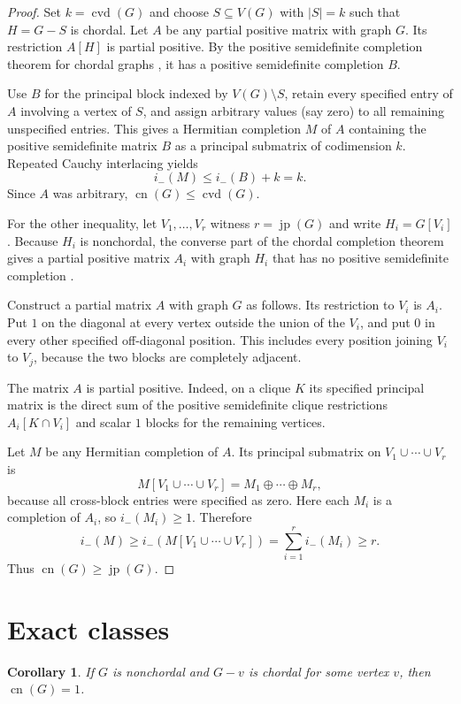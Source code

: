 \documentclass[11pt]{amsart}
\newtheorem{corollary}[theorem]{Corollary}
\newcommand{\cn}{\operatorname{cn}}
\newcommand{\cvd}{\operatorname{cvd}}
\newcommand{\jp}{\operatorname{jp}}
\begin{document}
\begin{proof}
Set $k=\cvd(G)$ and choose $S\subseteq V(G)$ with $|S|=k$ such that
$H=G-S$ is chordal.  Let $A$ be any partial positive matrix with graph $G$.
Its restriction $A[H]$ is partial positive.  By the positive semidefinite
completion theorem for chordal graphs \cite{GJSW}, it has a positive
semidefinite completion $B$.

Use $B$ for the principal block indexed by $V(G)\setminus S$, retain every
specified entry of $A$ involving a vertex of $S$, and assign arbitrary values
(say zero) to all remaining unspecified entries.  This gives a Hermitian
completion $M$ of $A$ containing the positive semidefinite matrix $B$ as a
principal submatrix of codimension $k$.  Repeated Cauchy interlacing yields
\[
 i_-(M)\leq i_-(B)+k=k.
\]
Since $A$ was arbitrary, $\cn(G)\leq\cvd(G)$.

For the other inequality, let $V_1,\ldots,V_r$ witness $r=\jp(G)$ and write
$H_i=G[V_i]$.  Because $H_i$ is nonchordal, the converse part of the chordal
completion theorem gives a partial positive matrix $A_i$ with graph $H_i$
that has no positive semidefinite completion \cite{GJSW,BC}.

Construct a partial matrix $A$ with graph $G$ as follows.  Its restriction to
$V_i$ is $A_i$.  Put $1$ on the diagonal at every vertex outside the union of
the $V_i$, and put $0$ in every other specified off-diagonal position.  This
includes every position joining $V_i$ to $V_j$, because the two blocks are
completely adjacent.

The matrix $A$ is partial positive.  Indeed, on a clique $K$ its specified
principal matrix is the direct sum of the positive semidefinite clique
restrictions $A_i[K\cap V_i]$ and scalar $1$ blocks for the remaining
vertices.

Let $M$ be any Hermitian completion of $A$.  Its principal submatrix on
$V_1\cup\cdots\cup V_r$ is
\[
 M[V_1\cup\cdots\cup V_r]
   =M_1\oplus\cdots\oplus M_r,
\]
because all cross-block entries were specified as zero.  Here each $M_i$ is a
completion of $A_i$, so $i_-(M_i)\geq1$.  Therefore
\[
 i_-(M)\geq i_-(M[V_1\cup\cdots\cup V_r])
 =\sum_{i=1}^r i_-(M_i)\geq r.
\]
Thus $\cn(G)\geq\jp(G)$.
\end{proof}

\section*{Exact classes}

\begin{corollary}\label{cor:one}
If $G$ is nonchordal and $G-v$ is chordal for some vertex $v$, then
$\cn(G)=1$.
\end{corollary}
\end{document}
